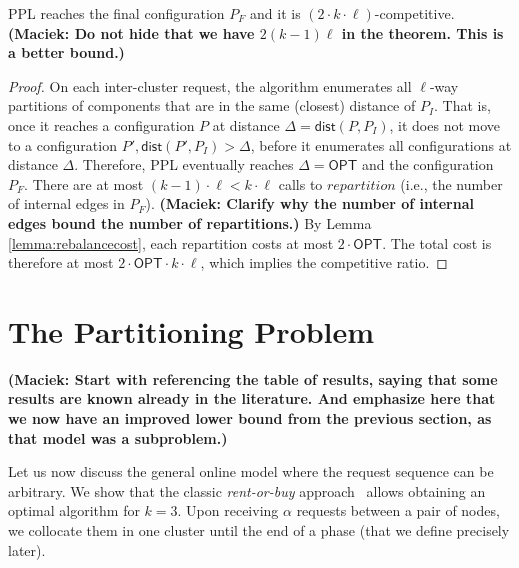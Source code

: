 \documentclass[manuscript,screen=true, review, anonymous]{acmart}
\newcommand{\OPT}{\textsf{OPT}\xspace}
\newcommand{\PPL}{\textsf{PPL}\xspace}
\newcommand{\OBRP}{BRP}
\newcommand{\dist}{\textsf{dist}}
\newcommand\mahmoud[1]{\color{orange}\textbf{Mahmoud: #1}\\\color{black}}
\newcommand\maciek[1]{\color{brown}\textbf{(Maciek: #1)}\color{black}}
\begin{document}
\begin{theorem}	\label{thm:upperbound}
	\PPL reaches the final configuration $P_F$ and it is $(2\cdot k\cdot\ell)$-competitive.
	\maciek{Do not hide that we have $2(k-1)\ell$ in the theorem. This is a better bound.}
\end{theorem}
\begin{proof}
	On each inter-cluster request,
	the algorithm enumerates all $\ell$-way partitions of components
	that are in the same (closest) distance of $P_I$.
	That is, 
	once it reaches a configuration $P$ at distance $\Delta = \dist(P, P_I)$,
	it does not move to a configuration
	$P', \dist(P', P_I) > \Delta$,
	before it enumerates all configurations at distance $\Delta$.
	Therefore,
	\PPL eventually reaches $\Delta=\OPT$ and the configuration $P_F$.
	There are at most $(k-1)\cdot\ell < k\cdot\ell $ calls   to $\mathit{repartition}$
	(i.e., the number of internal edges in $P_F$).
	\maciek{Clarify why the number of internal edges bound the number of repartitions.}
	By Lemma \ref{lemma:rebalancecost},
	each repartition costs at most $2\cdot\OPT$.
	The total cost is therefore at most $2\cdot\OPT\cdot k\cdot\ell$, which implies the competitive ratio.
\end{proof}


\section{The Partitioning Problem}
\label{sec:part}



\maciek{Start with referencing the table of results, saying that some results are known already in the literature. And emphasize here that we now have an improved lower bound from the previous section, as that model was a subproblem.}

Let us now discuss the general online
model where the request sequence
can be arbitrary.
We show that the classic \emph{rent-or-buy} approach~\cite{karlin-ski-rental} allows obtaining an optimal algorithm for $k=3$.
Upon receiving $\alpha$ requests between a pair of nodes, we collocate them in one cluster until the end of a phase (that we define precisely later).
\end{document}
